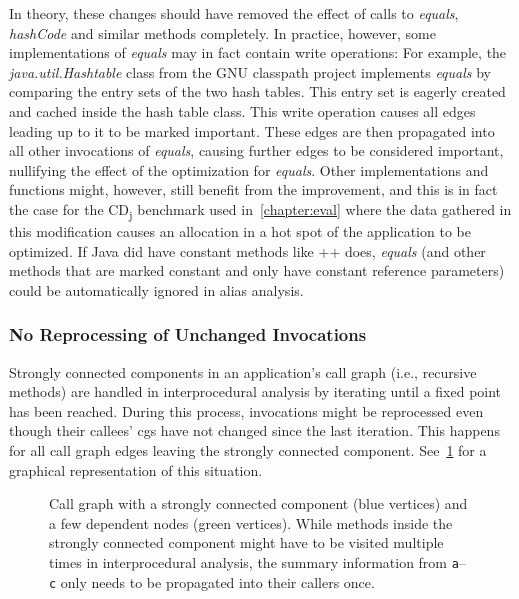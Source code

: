 				In theory, these changes should have removed the effect of calls to \emph{equals}, \emph{hashCode} and similar
				methods completely. In practice, however, some implementations of \emph{equals} may in fact contain write
				operations: For example, the \emph{java.util.Hashtable} class from the GNU classpath project implements
				\emph{equals} by comparing the entry sets of the two hash tables. This entry set is eagerly created and cached
				inside the hash table class. This write operation causes all edges leading up to it to be marked important.
				These edges are then propagated into all other invocations of \emph{equals}, causing further edges to be
				considered important, nullifying the effect of the optimization for \emph{equals}. Other implementations and
				functions might, however, still benefit from the improvement, and this is in fact the case for the
				CD\textsubscript{j} benchmark used in~\cref{chapter:eval} where the data gathered in this modification causes an
				allocation in a hot spot of the application to be optimized. If Java did have constant methods like \C++{} does,
				\emph{equals} (and other methods that are marked constant and only have constant reference parameters) could be
				automatically ignored in alias analysis.

			\subsubsection{No Reprocessing of Unchanged Invocations}
				\label{subsub:ea:improve:opt:quick-fixpoint}
				Strongly connected components in an application's call graph (i.e., recursive methods) are handled in
				interprocedural analysis by iterating until a fixed point has been reached. During this process, invocations
				might be reprocessed even though their callees' \glspl{cg} have not changed since the last iteration. This
				happens for all call graph edges leaving the strongly connected component.
				See~\cref{fig:ea:improve:quick-fixpoint} for a graphical representation of this situation.

				\begin{figure}
					\centering%

					\caption[Example call graph where avoiding reprocessing saves time]{%
						Call graph with a strongly connected component (blue {\color{cgblue}\blacksquare} vertices) and a few
						dependent nodes (green {\color{cggreen}\blacksquare} vertices). While methods inside the strongly connected
						component might have to be visited multiple times in interprocedural analysis, the summary information from
						\texttt{a}–\texttt{c} only needs to be propagated into their callers once.}%
					\label{fig:ea:improve:quick-fixpoint}%
				\end{figure}

